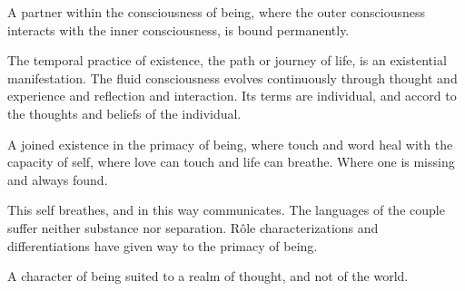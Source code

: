 \vfill
\break


A partner within the consciousness of being, where the outer
consciousness interacts with the inner consciousness, is bound
permanently.


\vfill
\break


The temporal practice of existence, the path or journey of life, is an
existential manifestation.  The fluid consciousness evolves
continuously through thought and experience and reflection and
interaction.  Its terms are individual, and accord to the thoughts and
beliefs of the individual.


\vfill
\break


A joined existence in the primacy of being, where touch and word heal
with the capacity of self, where love can touch and life can breathe.
Where one is missing and always found.  

This self breathes, and in this way communicates.  The languages of
the couple suffer neither substance nor separation.  R\^{o}le
characterizations and differentiations have given way to the primacy
of being.  

A character of being suited to a realm of thought, and not of the
world.


\vfill
\bye
